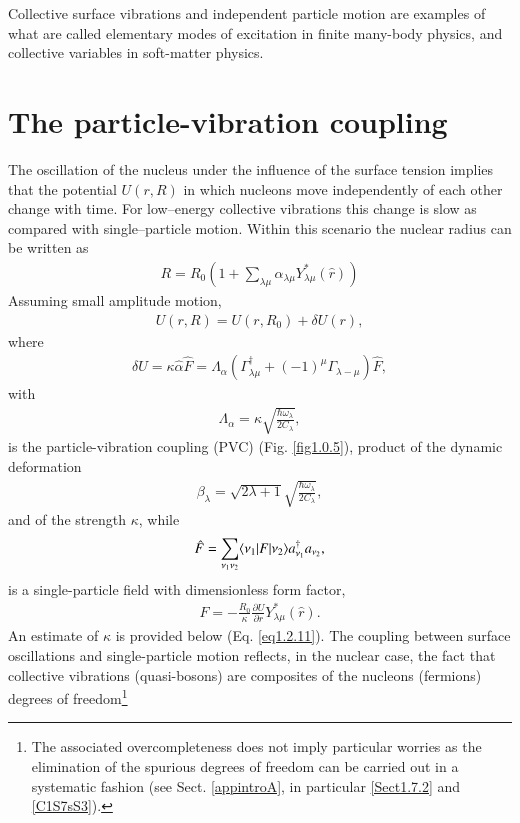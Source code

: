 Collective surface vibrations and independent particle motion are examples of what are called elementary modes of excitation in finite many-body physics, and collective variables in soft-matter physics.

\section{The particle-vibration coupling}\label{Sect1.2}
The oscillation of the nucleus under the influence of the surface tension implies that the potential $U(r,R)$ in which nucleons move independently of each other change with time. For low--energy collective vibrations this change is slow as compared with single--particle motion. Within this scenario the nuclear radius can be written as  
\begin{align}\label{eq1.0.12}
R=R_0\left(1+\sum_{\lambda\mu}\alpha_{\lambda\mu}Y_{\lambda\mu}^*(\hat r)\right)
\end{align}
Assuming small amplitude motion,
\begin{align}\label{eq1.0.13}
U(r,R)=U(r,R_0)+\delta U(r),
\end{align}
where
\begin{align}\label{eq1.0.14}
\delta U=\kappa\hat \alpha \hat F=\Lambda_\alpha\left(\Gamma_{\lambda\mu}^\dagger+(-1)^\mu\Gamma_{\lambda-\mu}\right)\hat F,
\end{align}
with
\begin{align}\label{eq1.2.4x}
\Lambda_\alpha=\kappa\sqrt{\frac{\hbar\omega_\lambda}{2C_\lambda}},
\end{align}
is the particle-vibration coupling (PVC) (Fig. \ref{fig1.0.5}), product of the dynamic deformation
\begin{align}\label{eq1.2.5x}
\beta_\lambda=\sqrt{2\lambda+1}\sqrt{\frac{\hbar\omega_\lambda}{2C_\lambda}},
\end{align}
and of the strength $\kappa$, while 
\begin{align}\label{eq1.0.15}
\hat F=\sum_{\nu_1\nu_2}\langle {\nu_1}|F|{\nu_2} \rangle a_{\nu_1}^\dagger a_{\nu_2},
\end{align}
is a single-particle field with  dimensionless form factor,
\begin{align}\label{eq1.0.16}
F=-\frac{R_0}{\kappa}\frac{\partial U}{\partial r}Y^*_{\lambda\mu}(\hat r).
\end{align}
An estimate of $\kappa$ is provided below (Eq. \ref{eq1.2.11}). The coupling between surface oscillations and single-particle motion reflects, in the nuclear case, the fact that collective vibrations (quasi-bosons) are composites of the nucleons (fermions) degrees of freedom\footnote{The associated overcompleteness does not imply particular worries as the elimination of the spurious degrees of freedom can be carried out in a systematic fashion (see Sect. \ref{appintroA}, in particular \ref{Sect1.7.2} and \ref{C1S7sS3}).}


